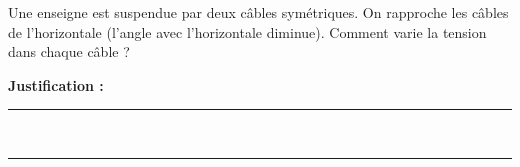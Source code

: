Une enseigne est suspendue par deux câbles symétriques. On rapproche les câbles de l'horizontale (l'angle avec l'horizontale diminue). Comment varie la tension dans chaque câble ?

\choices

\noindent\textbf{Justification :} \hrulefill \\[2.5ex]
\rule{\linewidth}{0.4pt} \\[2.5ex]
\rule{\linewidth}{0.4pt}
\vfill
